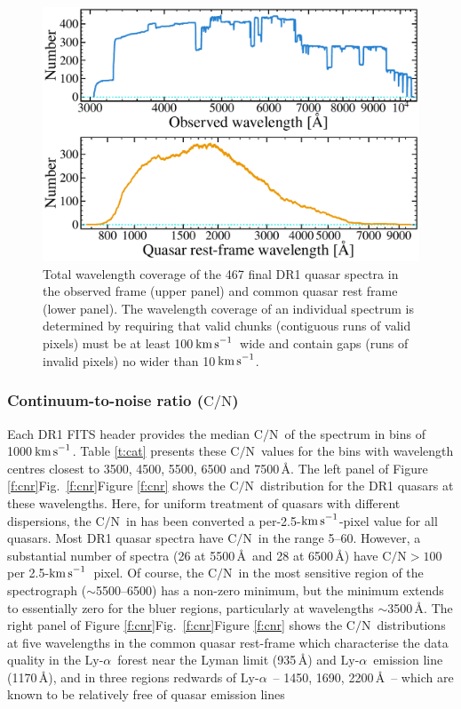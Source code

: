 \documentclass[fleqn,usenatbib,usedcolumn]{mnras}
\newcommand{\Tref}[1]{Table \ref{#1}}
\newcommand{\Fref}[1]{\ifhmode \ifnum\spacefactor=1001 Figure \ref{#1}\else Fig.\ \ref{#1}\fi \else Figure \ref{#1}\fi}
\newcommand{\kms}{\ensuremath{\textrm{km\,s}^{-1}}}
\newcommand{\CN}{\ensuremath{\textrm{C/N}}}
\newcommand{\lya}{\ensuremath{\textrm{Ly-}\alpha}}
\begin{document}
\begin{figure}
\begin{center}
\includegraphics[width=0.95\columnwidth]{DR1_wlcoverage.pdf}
\vspace{-1em}
\caption{Total wavelength coverage of the 467 final DR1 quasar spectra in the observed frame (upper panel) and common quasar rest frame (lower panel). The wavelength coverage of an individual spectrum is determined by requiring that valid chunks (contiguous runs of valid pixels) must be at least 100\,\kms\ wide and contain gaps (runs of invalid pixels) no wider than 10\,\kms.}
\label{f:wlcov}
\end{center}
\end{figure}

\subsubsection{Continuum-to-noise ratio (\CN)}\label{sss:CNR}

Each DR1 FITS header provides the median \CN\ of the spectrum in bins of 1000\,\kms. \Tref{t:cat} presents these \CN\ values for the bins with wavelength centres closest to 3500, 4500, 5500, 6500 and 7500\,\AA. The left panel of \Fref{f:cnr} shows the \CN\ distribution for the DR1 quasars at these wavelengths. Here, for uniform treatment of quasars with different dispersions, the \CN\ in has been converted a per-2.5-\kms-pixel value for all quasars. Most DR1 quasar spectra have \CN\ in the range 5--60. However, a substantial number of spectra (26 at 5500\,\AA\ and 28 at 6500\,\AA) have $\CN>100$\,per 2.5-\kms\ pixel. Of course, the \CN\ in the most sensitive region of the spectrograph ($\sim$5500--6500) has a non-zero minimum, but the minimum extends to essentially zero for the bluer regions, particularly at wavelengths $\sim$3500\,\AA. The right panel of \Fref{f:cnr} shows the \CN\ distributions at five wavelengths in the common quasar rest-frame which characterise the data quality in the \lya\ forest near the Lyman limit (935\,\AA) and \lya\ emission line (1170\,\AA), and in three regions redwards of \lya\ -- 1450, 1690, 2200\,\AA\ -- which are known to be relatively free of quasar emission lines \citep[e.g.][]{vandenBerk:2001:549,Murphy:2016:1043}
\end{document}
